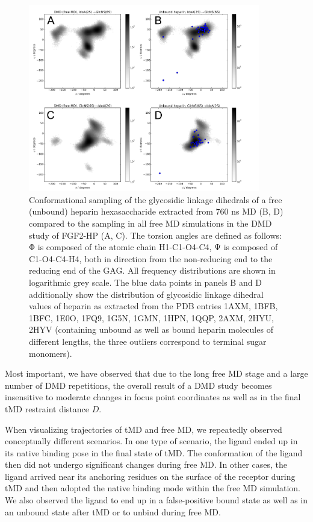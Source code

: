 \begin{figure}
\centering
\includegraphics[width=0.9\textwidth]{gfx/dmd/suppl/suppl_glyco_linkage_torsion_maps_03.png}
\caption[]{
Conformational sampling of the glycosidic linkage dihedrals of a free (unbound)
heparin hexasaccharide extracted from 760 ns MD (B, D) compared to the sampling
in all free MD simulations in the DMD study of FGF2-HP (A, C). The torsion
angles are defined as follows: Φ is composed of the atomic chain H1-C1-O4-C4, Ψ
is composed of C1-O4-C4-H4, both in direction from the non-reducing end to the
reducing end of the GAG. All frequency distributions are shown in logarithmic
grey scale. The blue data points in panels B and D additionally show the
distribution of glycosidic linkage dihedral values of heparin as extracted from
the PDB entries 1AXM, 1BFB, 1BFC, 1E0O, 1FQ9, 1G5N, 1GMN, 1HPN, 1QQP, 2AXM,
2HYU, 2HYV (containing unbound as well as bound heparin molecules of different
lengths, the three outliers correspond to terminal sugar monomers).
}
\label{fig:dmd:glycolinkage_sampling}
\end{figure}


Most important, we have observed that due to the long free MD stage and a large
number of DMD repetitions, the overall result of a DMD study becomes insensitive
to moderate changes in focus point coordinates as well as in the final tMD
restraint distance $D$.

When visualizing trajectories of tMD and free MD, we repeatedly observed
conceptually different scenarios. In one type of scenario, the ligand ended up
in its native binding pose in the final state of tMD. The conformation of the
ligand then did not undergo significant changes during free MD. In other cases,
the ligand arrived near its anchoring residues on the surface of the receptor
during tMD and then adopted the native binding mode within the free MD
simulation. We also observed the ligand to end up in a false-positive bound
state as well as in an unbound state after tMD or to unbind during free MD.

